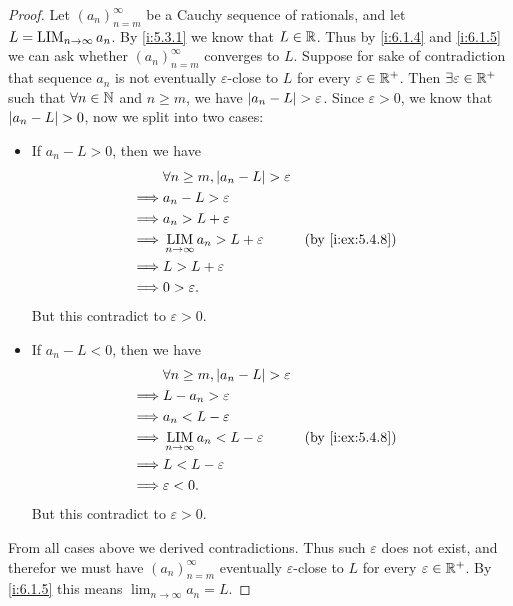 \begin{proof}
  Let \((a_n)_{n = m}^\infty\) be a Cauchy sequence of rationals, and let \(L = \operatorname*{LIM}_{n \to \infty} a_n\).
  By \cref{i:5.3.1} we know that \(L \in \mathbb{R}\).
  Thus by \cref{i:6.1.4} and \cref{i:6.1.5} we can ask whether \((a_n)_{n = m}^\infty\) converges to \(L\).
  Suppose for sake of contradiction that sequence \(a_n\) is not eventually \(\varepsilon\)-close to \(L\) for every \(\varepsilon \in \mathbb{R}^+\).
  Then \(\exists \varepsilon \in \mathbb{R}^+\) such that \(\forall n \in \mathbb{N}\) and \(n \geq m\), we have \(\left\lvert a_n - L\right\rvert > \varepsilon\).
  Since \(\varepsilon > 0\), we know that \(\left\lvert a_n - L\right\rvert > 0\), now we split into two cases:
  \begin{itemize}
    \item If \(a_n - L > 0\), then we have
          \begin{align*}
                     & \forall n \geq m, \abs{a_n - L} > \varepsilon                      \\
            \implies & a_n - L > \varepsilon                                              \\
            \implies & a_n > L + \varepsilon                                              \\
            \implies & \LIM_{n \to \infty} a_n > L + \varepsilon     &  & \by{i:ex:5.4.8} \\
            \implies & L > L + \varepsilon                                                \\
            \implies & 0 > \varepsilon.
          \end{align*}
          But this contradict to \(\varepsilon > 0\).
    \item If \(a_n - L < 0\), then we have
          \begin{align*}
                     & \forall n \geq m, \abs{a_n - L} > \varepsilon                      \\
            \implies & L - a_n > \varepsilon                                              \\
            \implies & a_n < L - \varepsilon                                              \\
            \implies & \LIM_{n \to \infty} a_n < L - \varepsilon     &  & \by{i:ex:5.4.8} \\
            \implies & L < L - \varepsilon                                                \\
            \implies & \varepsilon < 0.
          \end{align*}
          But this contradict to \(\varepsilon > 0\).
  \end{itemize}
  From all cases above we derived contradictions.
  Thus such \(\varepsilon\) does not exist, and therefor we must have \((a_n)_{n = m}^\infty\) eventually \(\varepsilon\)-close to \(L\) for every \(\varepsilon \in \mathbb{R}^+\).
  By \cref{i:6.1.5} this means \(\lim_{n \to \infty} a_n = L\).
\end{proof}


